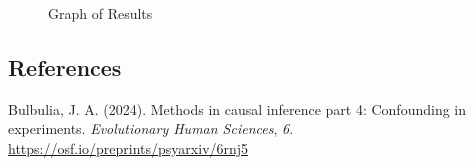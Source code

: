 \documentclass[
  single column]{article}
\newlength{\cslhangindent}
\newenvironment{CSLReferences}[2] %
 {\begin{list}{}{%
  \setlength{\itemindent}{0pt}
  \setlength{\leftmargin}{0pt}
  \setlength{\parsep}{0pt}
  \ifodd #1
   \setlength{\leftmargin}{\cslhangindent}
   \setlength{\itemindent}{-1\cslhangindent}
  \fi
  \setlength{\itemsep}{#2\baselineskip}}}
 {\end{list}}
\begin{document}
\begin{figure}[H]


\caption{\label{fig-1_1}Graph of Results}

\end{figure}%

\newpage{}

\subsection*{References}\label{references}

\label{refs}
\begin{CSLReferences}{1}{0}
Bulbulia, J. A. (2024). Methods in causal inference part 4: Confounding
in experiments. \emph{Evolutionary Human Sciences}, \emph{6}.
\url{https://osf.io/preprints/psyarxiv/6rnj5}

\end{CSLReferences}
\end{document}
